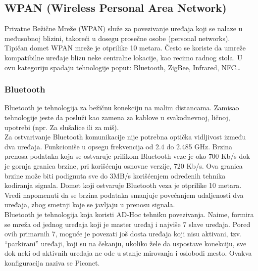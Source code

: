 \documentclass[a4paper]{article}
\begin{document}
    \subsection{WPAN (Wireless Personal Area Network)}
Privatne Bežične Mreže (WPAN) služe za povezivanje uređaja koji se nalaze u međusobnoj blizini, takoreći u dosegu prosečne osobe (personal networks). Tipičan domet WPAN mreže je otprilike 10 metara. Često se koriste da umreže kompatibilne uređaje blizu neke centralne lokacije, kao recimo radnog stola. U ovu kategoriju spadaju tehnologije poput: Bluetooth, ZigBee, Infrared, NFC…

        \subsubsection{Bluetooth}
Bluetooth je tehnologija za bežičnu konekciju na malim distancama. Zamisao tehnologije jeste da posluži kao zamena za kablove u svakodnevnoj, ličnoj, upotrebi (npr. Za slušalice ili za miš).\\
Za ostvarivanje Bluetooth komunikacije nije potrebna optička vidljivost između dva uređaja. Funkcioniše u opsegu frekvencija od 2.4 do 2.485 GHz. Brzina prenosa podataka koja se ostvaruje prilikom Bluetooth veze je oko 700 Kb/s dok je gornja granica brzine, pri korišćenju osnovne verzije, 720 Kb/s. Ova granica brzine može biti podignuta sve do 3MB/s korišćenjem određenih tehnika kodiranja signala.
Domet koji ostvaruje Bluetooth veza je otprilike 10 metara. Vredi napomenuti da se brzina podataka smanjuje povećanjem udaljenosti dva uređaja, zbog smetnji koje se javljaju u prenosu signala.\\
Bluetooth je tehnologija koja koristi AD-Hoc tehniku povezivanja. Naime, formira se mreža od jednog uređaja koji je master uređaj i najviše 7 slave uređaja. Pored ovih primarnih 7, moguće je povezati još dosta uređaja koji nisu aktivani, tzv. “parkirani” uređaji, koji su na čekanju, ukoliko žele da uspostave konekciju, sve dok neki od aktivnih uređaja ne ode u stanje mirovanja i oslobodi mesto. Ovakva konfiguracija naziva se Piconet.\\
\end{document}
